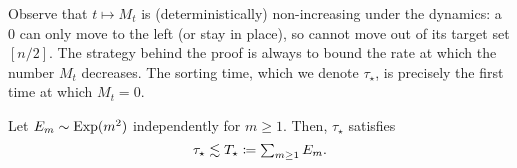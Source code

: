 \documentclass{article}
\begin{document}
Observe that $t \mapsto M_t$ is (deterministically) non-increasing under the dynamics: a 0 can only move to the left (or stay in place), so cannot move out of its target set $[n/2]$.
The strategy behind the proof is always to bound the rate at which the number $M_t$ decreases.
The sorting time, which we denote $\tau_\star$, is precisely the first time at which $M_t = 0$.

%

\begin{prop}
\label{res:unif:rate-hit}
Let $E_m \sim \operatorname{Exp}(m^2)$ independently for $m \ge 1$.
Then, $\tau_\star$ satisfies
\[
	\tau_\star
\lesssim
	T_\star
\cq
	\sumt{m\ge1}
	E_m.
\]
\end{prop}
\end{document}
